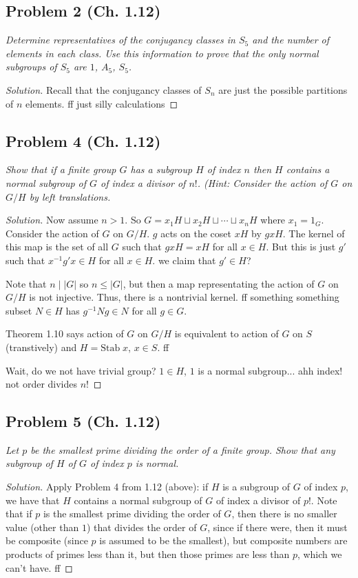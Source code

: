\documentclass{article}
\begin{document}
\subsection*{Problem 2 (Ch. 1.12)}
{\it Determine representatives of the conjugancy classes in $S_5$
and the number of elements in each class.
Use this information to prove that the only normal subgroups
of $S_5$ are $1$, $A_5$, $S_5$.}
\begin{proof}[Solution]\let\qed\relax
	Recall that the conjugancy classes of $S_n$
	are just the possible partitions of $n$ elements.
	ff just silly calculations
\end{proof}

\subsection*{Problem 4 (Ch. 1.12)}
{\it Show that if a finite group $G$ has a subgroup $H$ of index $n$
then $H$ contains a normal subgroup of $G$ of index a divisor of $n!$.
(\emph{Hint}: Consider the action of $G$ on $G/H$ by left translations.}
\begin{proof}[Solution]\let\qed\relax
	Now assume $n > 1$.
	So $G = x_1H \sqcup x_2H \sqcup \cdots \sqcup x_nH$
	where $x_1 = 1_G$.
	Consider the action of $G$ on $G/H$.
	$g$ acts on the coset $xH$ by $gxH$.
	The kernel of this map is the set of all $G$ such that $gxH = xH$
	for all $x \in H$.
	But this is just $g'$ such that $x^{-1}g'x \in H$ for all $x \in H$.
	we claim that $g' \in H$?


	Note that $n \mid |G|$ so $n\leq |G|$,
	but then a map representating the action of $G$ on $G/H$
	is not injective.
	Thus, there is a nontrivial kernel.
	ff
	something something subset $N \in H$ has $g^{-1}Ng \in N$
	for all $g \in G$.

	Theorem 1.10 says action of $G$ on $G/H$ is equivalent to
	action of $G$ on $S$ (transtively) and $H = \mathrm{Stab}\;x$, $x\in S$.
	ff

	Wait, do we not have trivial group?
	$1 \in H$, $1$ is a normal subgroup... ahh index! not order divides $n!$
\end{proof}

\subsection*{Problem 5 (Ch. 1.12)}
{\it Let $p$ be the smallest prime dividing the order of a finite group.
Show that any subgroup of $H$ of $G$ of index $p$ is normal.}
\begin{proof}[Solution]\let\qed\relax
	Apply Problem 4 from 1.12 (above):
	if $H$ is a subgroup of $G$ of index $p$,
	we have that $H$ contains a normal subgroup of $G$
	of index a divisor of $p!$.
	Note that if $p$ is the smallest prime dividing the order of $G$,
	then there is no smaller value (other than $1$)
	that divides the order of $G$,
	since if there were,
	then it must be composite (since $p$ is assumed to be the smallest),
	but composite numbers are products of primes less than it,
	but then those primes are less than $p$, which we can't have.
	ff
\end{proof}
\end{document}
